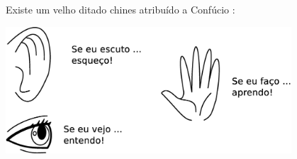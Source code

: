 

\begin{elaboracion}[title=Ditado chines, width= 1.00\linewidth]
Existe um velho ditado chines atribuído a Confúcio \cite[pp. 60, 63]{AprendendoInteligencia2008} \cite[pp. 9]{abe2002introducao}:\\
\begin{center}
    \includegraphics[width=0.8\textwidth]{chapters/cap-learning/ditadochines.eps}
\end{center}
\end{elaboracion}
